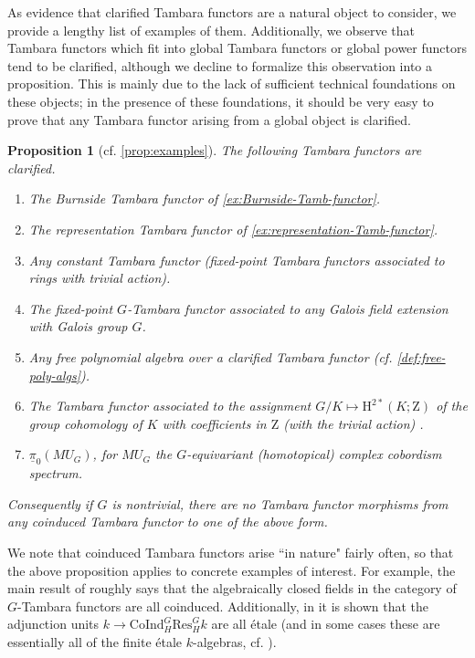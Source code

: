\documentclass[11pt,dvipsnames]{amsart}
\newtheorem{propositionLET}[theoremLET]{Proposition}
\theoremstyle{BoldRemark}
\newcommand{\Res}{\mathrm{Res}}
\newcommand{\Coind}{\mathrm{CoInd}}
\begin{document}
As evidence that clarified Tambara functors are a natural object to consider, we provide a lengthy list of examples of them. Additionally, we observe that Tambara functors which fit into global Tambara functors or global power functors tend to be clarified, although we decline to formalize this observation into a proposition. This is mainly due to the lack of sufficient technical foundations on these objects; in the presence of these foundations, it should be very easy to prove that any Tambara functor arising from a global object is clarified.

\begin{propositionLET}[cf. \cref{prop:examples}]
	The following Tambara functors are clarified.
	\begin{enumerate}
		\item The Burnside Tambara functor of \cref{ex:Burnside-Tamb-functor}.
		\item The representation Tambara functor of \cref{ex:representation-Tamb-functor}.
		\item Any constant Tambara functor (fixed-point Tambara functors associated to rings with trivial action).
		\item The fixed-point $G$-Tambara functor associated to any Galois field extension with Galois group $G$.
		\item Any free polynomial algebra over a clarified Tambara functor (cf. \cref{def:free-poly-algs}).
		\item The Tambara functor associated to the assignment $G/K \mapsto \mathrm{H}^{2*}(K;\mathrm{Z})$ of the group cohomology of $K$ with coefficients in $\mathrm{Z}$ (with the trivial action) \cite{Eve63} \cite{Tam93}.
		\item $\underline{\pi}_0(MU_G)$, for $MU_G$ the $G$-equivariant (homotopical) complex cobordism spectrum.
	\end{enumerate}
	Consequently if $G$ is nontrivial, there are no Tambara functor morphisms from any coinduced Tambara functor to one of the above form.
\end{propositionLET}

We note that coinduced Tambara functors arise ``in nature" fairly often, so that the above proposition applies to concrete examples of interest. For example, the main result of \cite{SSW24} roughly says that the algebraically closed fields in the category of $G$-Tambara functors are all coinduced. Additionally, in \cite[Theorem A]{Wis25c} it is shown that the adjunction units $k \rightarrow \Coind_H^G \Res_H^G k$ are all \'{e}tale (and in some cases these are essentially all of the finite \'{e}tale $k$-algebras, cf. \cite[Theorem C]{Wis25c}).
\end{document}
